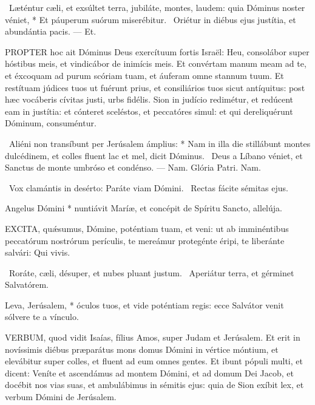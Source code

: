 \R\ Læténtur cæli, et exsúltet terra, jubiláte, montes, laudem: quia Dóminus noster véniet, * Et páuperum suórum miserébitur. \V\ Oriétur in diébus ejus justítia, et abundántia pacis. --- Et.


\lettrine[lines=2]{P}{ROPTER} hoc ait Dóminus Deus exercítuum fortis Israël: Heu, consolábor super hóstibus meis, et vindicábor de inimícis meis. Et convértam manum meam ad te, et éxcoquam ad purum scóriam tuam, et áuferam omne stannum tuum. Et restítuam júdices tuos ut fuérunt prius, et consiliários tuos sicut antíquitus: post hæc vocáberis cívitas justi, urbs fidélis. Sion in judício redimétur, et redúcent eam in justítia: et cónteret sceléstos, et peccatóres simul: et qui dereliquérunt Dóminum, consuméntur.

\R\ Aliéni non transíbunt per Jerúsalem ámplius: * Nam in illa die stillábunt montes dulcédinem, et colles fluent lac et mel, dicit Dóminus. \V\ Deus a Líbano véniet, et Sanctus de monte umbróso et condénso. --- Nam. Glória Patri. Nam.

\V\ Vox clamántis in desérto: Paráte viam Dómini. \R\ Rectas fácite sémitas ejus.

 Angelus Dómini * nuntiávit Maríæ, et concépit de Spíritu Sancto, allelúja.


\lettrine[lines=2]{E}{XCITA}, quǽsumus, Dómine, poténtiam tuam, et veni: ut ab imminéntibus peccatórum nostrórum perículis, te mereámur protegénte éripi, te liberánte salvári: Qui vivis.

\V\ Roráte, cæli, désuper, et nubes pluant justum. \R\ Aperiátur terra, et gérminet Salvatórem.

 Leva, Jerúsalem, * óculos tuos, et vide poténtiam regis: ecce Salvátor venit sólvere te a vínculo.

\sectionornament




\lettrine[lines=2]{V}{ERBUM}, quod vidit Isaías, fílius Amos, super Judam et Jerúsalem. Et erit in novíssimis diébus præparátus mons domus Dómini in vértice móntium, et elevábitur super colles, et fluent ad eum omnes gentes. Et ibunt pópuli multi, et dicent: Veníte et ascendámus ad montem Dómini, et ad domum Dei Jacob, et docébit nos vias suas, et ambulábimus in sémitis ejus: quia de Sion exíbit lex, et verbum Dómini de Jerúsalem.

